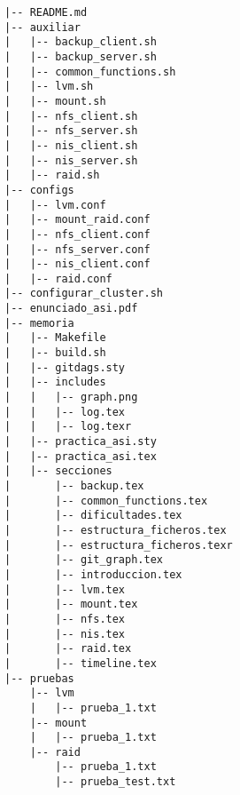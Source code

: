 \begin{verbatim}
|-- README.md
|-- auxiliar
|   |-- backup_client.sh
|   |-- backup_server.sh
|   |-- common_functions.sh
|   |-- lvm.sh
|   |-- mount.sh
|   |-- nfs_client.sh
|   |-- nfs_server.sh
|   |-- nis_client.sh
|   |-- nis_server.sh
|   |-- raid.sh
|-- configs
|   |-- lvm.conf
|   |-- mount_raid.conf
|   |-- nfs_client.conf
|   |-- nfs_server.conf
|   |-- nis_client.conf
|   |-- raid.conf
|-- configurar_cluster.sh
|-- enunciado_asi.pdf
|-- memoria
|   |-- Makefile
|   |-- build.sh
|   |-- gitdags.sty
|   |-- includes
|   |   |-- graph.png
|   |   |-- log.tex
|   |   |-- log.texr
|   |-- practica_asi.sty
|   |-- practica_asi.tex
|   |-- secciones
|       |-- backup.tex
|       |-- common_functions.tex
|       |-- dificultades.tex
|       |-- estructura_ficheros.tex
|       |-- estructura_ficheros.texr
|       |-- git_graph.tex
|       |-- introduccion.tex
|       |-- lvm.tex
|       |-- mount.tex
|       |-- nfs.tex
|       |-- nis.tex
|       |-- raid.tex
|       |-- timeline.tex
|-- pruebas
    |-- lvm
    |   |-- prueba_1.txt
    |-- mount
    |   |-- prueba_1.txt
    |-- raid
        |-- prueba_1.txt
        |-- prueba_test.txt
\end{verbatim}
